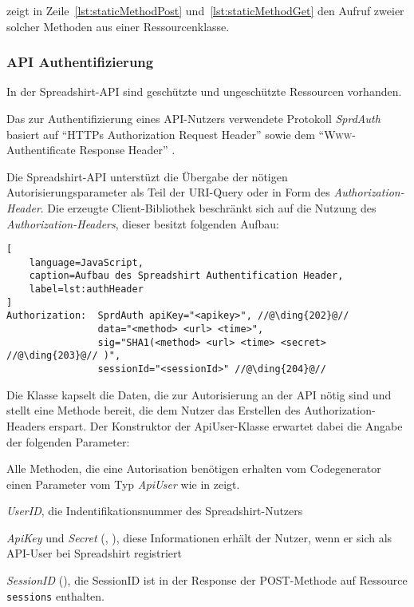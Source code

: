  zeigt in Zeile~\ref{lst:staticMethodPost} und~\ref{lst:staticMethodGet} den Aufruf zweier solcher Methoden aus einer Ressourcenklasse.

\subsubsection{API Authentifizierung}
\label{sec:api_auth}

In der Spreadshirt-\gls{API} sind geschützte und ungeschützte Ressourcen vorhanden. 

Das zur Authentifizierung eines \gls{API}-Nutzers verwendete Protokoll \emph{SprdAuth} basiert auf \enquote{\gls{HTTP}s Authorization Request Header} sowie dem \enquote{\textsc{Www}-Authentificate Response Header} \cite{apiSecurity}.

Die Spreadshirt-\gls{API} unterstüzt die Übergabe der nötigen Autorisierungsparameter als Teil der \gls{URI}-Query oder in Form des \emph{Authorization-Header}. Die erzeugte Client-Bibliothek beschränkt sich auf die Nutzung des \emph{Authorization-Headers}, dieser besitzt folgenden Aufbau:

\begin{lstlisting}[
    language=JavaScript,
    caption=Aufbau des Spreadshirt Authentification Header,
    label=lst:authHeader
]
Authorization:  SprdAuth apiKey="<apikey>", //@\ding{202}@// 
                data="<method> <url> <time>", 
                sig="SHA1(<method> <url> <time> <secret> //@\ding{203}@// )", 
                sessionId="<sessionId>" //@\ding{204}@//
\end{lstlisting}

Die Klasse  kapselt die Daten, die zur Autorisierung an der \gls{API} nötig sind und stellt eine Methode bereit, die dem Nutzer das Erstellen des Authorization-Headers erspart. Der Konstruktor der ApiUser-Klasse erwartet dabei die Angabe der folgenden Parameter:

Alle Methoden, die eine Autorisation benötigen erhalten vom Codegenerator einen Parameter vom Typ \emph{ApiUser} wie  in  zeigt.

\begin{compactitem}
    \item \emph{UserID}, die Indentifikationsnummer des Spreadshirt-Nutzers
    \item \emph{ApiKey} und \emph{Secret} (, ), diese Informationen erhält der Nutzer, wenn er sich als \gls{API}-User bei Spreadshirt registriert
    \item \emph{SessionID} (), die SessionID ist in der Response der POST-Methode auf Ressource \texttt{sessions} enthalten.
\end{compactitem}
